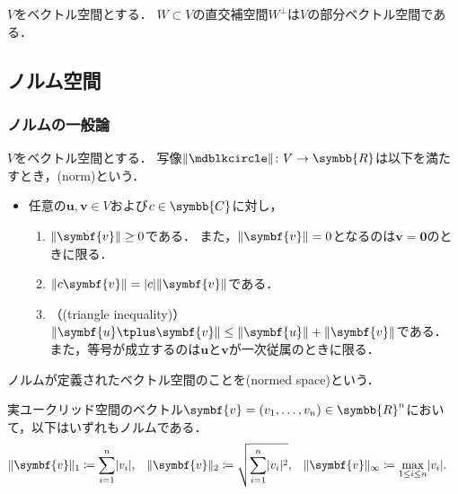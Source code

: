 \documentclass[../sotsu.tex]{subfiles}
\begin{document}
\begin{corollary}
    $V$をベクトル空間とする．
    $W \subset V$の直交補空間$W^\perp$は$V$の部分ベクトル空間である．
\end{corollary}





\subsection{ノルム空間}
\label{sec:norm-space}

\subsubsection{ノルムの一般論}

\begin{definition}[ノルム]
    \label{dfn:norm}
    $V$をベクトル空間とする．
    写像$\norm{\bigdot} \colon V \to \symbb{R}$は以下を満たすとき，(norm)という．
    \begin{itemize}
        \item 任意の$\symbf{u}, \symbf{v} \in V$および$c \in \symbb{C}$に対し，
        \begin{enumerate}
            \item \label{norm:positivity}$\norm{\symbf{v}} \geq 0$である．
                また，$\norm{\symbf{v}} = 0$となるのは$\symbf{v} = \symbf{0}$のときに限る．
            \item \label{norm:absolute-homogeneity} $\norm{c\symbf{v}} = \abs{c} \norm{\symbf{v}}$である．
            \item \label{norm:triangle-inequality} （(triangle inequality)）
                $\norm{\symbf{u} \tplus \symbf{v}} \leq \norm{\symbf{u}} + \norm{\symbf{v}}$である．
                また，等号が成立するのは$\symbf{u}$と$\symbf{v}$が一次従属のときに限る．
        \end{enumerate}
    \end{itemize}
    ノルムが定義されたベクトル空間のことを(normed space)という．
\end{definition}

\begin{example}
    実ユークリッド空間のベクトル$\symbf{v} = (v_1, \dots, v_n) \in \symbb{R}^n$において，以下はいずれもノルムである．
    \begin{align}
        \norm{\symbf{v}}_1      &\coloneq        \sum_{i=1}^{n}  \abs{v_i},      &
        \norm{\symbf{v}}_2      &\coloneq \sqrt{ \sum_{i=1}^{n}  \abs{v_i}^2 },  &
        \norm{\symbf{v}}_\infty &\coloneq \max_{1 \leq i \leq n} \abs{v_i}.      &
    \end{align}
\end{example}
\end{document}
